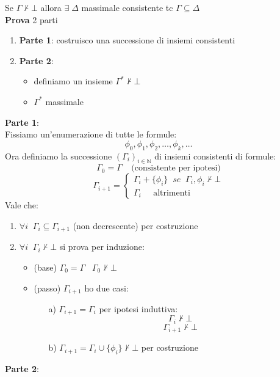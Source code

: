 \documentclass{article}
\theoremstyle{break}
\theoremstyle{break}
\theoremstyle{break}
\theoremstyle{break}
\begin{document}
Se \( \Gamma \not\vdash \bot \) allora \( \exists \; \Delta \) massimale consistente tc
\( \Gamma \subseteq \Delta \)\\
\textbf{Prova} 2 parti
\begin{enumerate}
  \item \textbf{Parte 1}: costruisco una successione di insiemi consistenti
  \item \textbf{Parte 2}: 
    \begin{itemize}
      \item definiamo un insieme \( \Gamma^* \not\vdash \bot \)
        \item \( \Gamma^* \) massimale 
    \end{itemize}
\end{enumerate}
\textbf{Parte 1}:\\
Fissiamo un'enumerazione di tutte le formule:
\[
\phi_0, \phi_1, \phi_2, \ldots, \phi_k, \ldots
\] 
Ora definiamo la successione \( (\Gamma_i)_{i \in \mathbb{N}} \) di insiemi consistenti di formule:
\[
\Gamma_0 = \Gamma\;\;\;\; \text{(consistente per ipotesi)}
\] 
\[
  \Gamma_{i+1} = \begin{cases}
    \Gamma_i + \{\phi_i\}\;\;se\;\; \Gamma_i,\phi_i \not\vdash \bot \\
    \Gamma_i\;\;\;\;\; \text{altrimenti}
  \end{cases}
\]  
Vale che:
\begin{enumerate}
  \item \( \forall i \;\; \Gamma_i \subseteq \Gamma_{i+1} \) (non decrescente) per costruzione
  \item \( \forall i\;\; \Gamma_i \not\vdash \bot \) si prova per induzione:
    \begin{itemize}
      \item (base) \( \Gamma_0 = \Gamma \;\;\; \Gamma_0 \not\vdash \bot \) 
      \item (passo) \( \Gamma_{i+1} \) ho due casi:
        \begin{enumerate}
          \item[a)] \( \Gamma_{i+1} = \Gamma_i \) per ipotesi induttiva:
            \[ \Gamma_i \not\vdash \bot \]
            \[
              \Gamma_{i+1} \not\vdash \bot
            \] 
        \item[b)] \( \Gamma_{i+1} = \Gamma_i \cup \{\phi_i\} \not\vdash \bot \) per costruzione
        \end{enumerate}
    \end{itemize}
\end{enumerate}
\textbf{Parte 2}:\\
\end{document}
